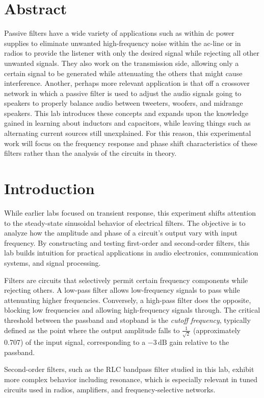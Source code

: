 \documentclass[12pt]{article}
\begin{document}
\section{Abstract}
Passive filters have a wide variety of applications such as within dc power
supplies to eliminate unwanted high-frequency noise within the ac-line or in
radios to provide the listener with only the desired signal while rejecting all
other unwanted signals. They also work on the transmission side, allowing only a
certain signal to be generated while attenuating the others that might cause
interference. Another, perhaps more relevant application is that off a crossover
network in which a passive filter is used to adjust the audio signals going to
speakers to properly balance audio between tweeters, woofers, and midrange
speakers. This lab introduces these concepts and expands upon the knowledge
gained in learning about inductors and capacitors, while leaving things such as
alternating current sources still unexplained. For this reason, this
experimental work will focus on the frequency response and phase shift
characteristics of these filters rather than the analysis of the circuits in
theory.

\newpage
\section{Introduction}

While earlier labs focused on transient response, this experiment shifts attention to the steady-state sinusoidal behavior of electrical filters. The objective is to analyze how the amplitude and phase of a circuit’s output vary with input frequency. By constructing and testing first-order and second-order filters, this lab builds intuition for practical applications in audio electronics, communication systems, and signal processing.

Filters are circuits that selectively permit certain frequency components while rejecting others. A low-pass filter allows low-frequency signals to pass while attenuating higher frequencies. Conversely, a high-pass filter does the opposite, blocking low frequencies and allowing high-frequency signals through. The critical threshold between the passband and stopband is the \textit{cutoff frequency}, typically defined as the point where the output amplitude falls to $\frac{1}{\sqrt{2}}$ (approximately 0.707) of the input signal, corresponding to a $-3\,\mathrm{dB}$ gain relative to the passband.

Second-order filters, such as the RLC bandpass filter studied in this lab, exhibit more complex behavior including resonance, which is especially relevant in tuned circuits used in radios, amplifiers, and frequency-selective networks.
\end{document}
